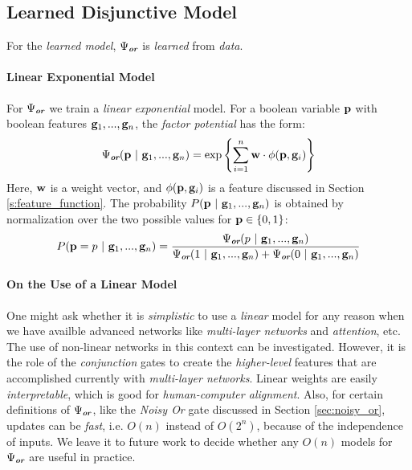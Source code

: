 \documentclass[11pt]{article}
\newcommand{\pvariable}{{\bf p}}
\newcommand{\gvariable}{{\bf g}}
\newcommand{\wvariable}{{\bf w}}
\newcommand{\condsep}{\ |\ }
\newcommand{\opor}{\textbf{\em or}}
\begin{document}
\subsection{Learned Disjunctive Model}
\label{sec:learned_model}
For the {\em learned model}, $\Psi_\opor$ is {\em learned} from {\em data}.

\paragraph{Linear Exponential Model}
For $\Psi_\opor$ we train a {\em linear exponential} model.
For a boolean variable \( \pvariable \) with boolean features \( \gvariable_1, ..., \gvariable_n \), the {\em factor potential} has the form:
\begin{equation} 
\Psi_{\opor} (\pvariable \condsep \gvariable_1, ..., \gvariable_n) = \exp{ \left\{\sum_{i=1}^{n} {\wvariable \cdot \phi(\pvariable, \gvariable_i)}\right\}}
\label{e_linear_exponential}
\end{equation}
Here, \( \wvariable \) is a weight vector, and \( \phi(\pvariable, \gvariable_i) \) is a feature discussed in Section \ref{s:feature_function}.
The probability \( P(\pvariable \condsep \gvariable_1, ..., \gvariable_n) \) is obtained by normalization over the two possible values for \( \pvariable \in \left\{0, 1\right\} \):
\begin{equation} 
P(\pvariable = p \condsep \gvariable_1, ..., \gvariable_n) = \frac{\Psi_{\opor} (p \condsep \gvariable_1, ..., \gvariable_n)}{\Psi_{\opor} (1 \condsep \gvariable_1, ..., \gvariable_n) + \Psi_{\opor} (0 \condsep \gvariable_1, ..., \gvariable_n)} 
\end{equation}

\paragraph{On the Use of a Linear Model}
One might ask whether it is {\em simplistic} to use a {\em linear} model for any reason when we have availble advanced networks like {\em multi-layer networks} and {\em attention}, etc.
The use of non-linear networks in this context can be investigated.
However, it is the role of the {\em conjunction} gates to create the {\em higher-level} features that are accomplished currently with {\em multi-layer networks}.
Linear weights are easily {\em interpretable}, which is good for {\em human-computer alignment}.
Also, for certain definitions of $\Psi_\opor$, like the {\em Noisy Or} gate discussed in Section \ref{sec:noisy_or}, updates can be {\em fast}, i.e. $O(n)$ instead of $O(2^n)$, because of the independence of inputs.
We leave it to future work to decide whether any $O(n)$ models for $\Psi_\opor$ are useful in practice.
\end{document}

